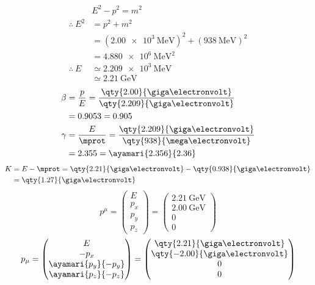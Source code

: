 \begin{align*}
  &E^{2}-p^{2}=m^{2}\\
  \therefore\ E^{2}&=p^{2}+m^{2}\\
  &=(\qty{2.00e3}{\mega\electronvolt})^{2}+(\qty{938}{\mega\electronvolt})^{2}\\
  &=\qty{4.880e6}{\mega\electronvolt\squared}\\
  \therefore\ E&\simeq\qty{2.209e3}{\mega\electronvolt}\\
  &\simeq\qty{2.21}{\giga\electronvolt}
\end{align*}
\begin{align*}
  \beta&=\frac{p}{E}=\frac{\qty{2.00}{\giga\electronvolt}}{\qty{2.209}{\giga\electronvolt}}\\
  &=0.9053=0.905\\
  \gamma&=\frac{E}{\mprot}=\frac{\qty{2.209}{\giga\electronvolt}}{\qty{938}{\mega\electronvolt}}\\
  &=2.355=\ayamari{2.356}{2.36}
\end{align*}
\begin{align*}
  K&=E-\mprot=\qty{2.21}{\giga\electronvolt}-\qty{0.938}{\giga\electronvolt}\\
  &=\qty{1.27}{\giga\electronvolt}
\end{align*}
\[ p^{\mu}=\begin{pmatrix}E\\ p_{x}\\ p_{y}\\ p_{z}\end{pmatrix}=\begin{pmatrix}\qty{2.21}{\giga\electronvolt}\\ \qty{2.00}{\giga\electronvolt}\\ 0\\ 0\end{pmatrix} \]
\[ p_{\mu}=\begin{pmatrix}E\\ -p_{x}\\ \ayamari{p_{y}}{-p_{y}}\\ \ayamari{p_{z}}{-p_{z}}\end{pmatrix}=\begin{pmatrix}\qty{2.21}{\giga\electronvolt}\\ \qty{-2.00}{\giga\electronvolt}\\ 0\\ 0\end{pmatrix} \]
